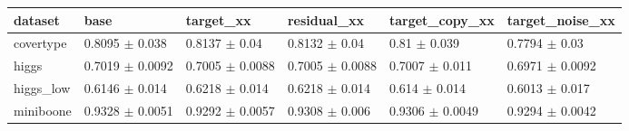 \begin{tabular}{llllll}
\toprule
dataset & base & target\_xx & residual\_xx & target\_copy\_xx & target\_noise\_xx \\
\midrule
covertype & 0.8095 $\pm$ 0.038 & 0.8137 $\pm$ 0.04 & 0.8132 $\pm$ 0.04 & 0.81 $\pm$ 0.039 & 0.7794 $\pm$ 0.03 \\
higgs & 0.7019 $\pm$ 0.0092 & 0.7005 $\pm$ 0.0088 & 0.7005 $\pm$ 0.0088 & 0.7007 $\pm$ 0.011 & 0.6971 $\pm$ 0.0092 \\
higgs\_low & 0.6146 $\pm$ 0.014 & 0.6218 $\pm$ 0.014 & 0.6218 $\pm$ 0.014 & 0.614 $\pm$ 0.014 & 0.6013 $\pm$ 0.017 \\
miniboone & 0.9328 $\pm$ 0.0051 & 0.9292 $\pm$ 0.0057 & 0.9308 $\pm$ 0.006 & 0.9306 $\pm$ 0.0049 & 0.9294 $\pm$ 0.0042 \\
\bottomrule
\end{tabular}
